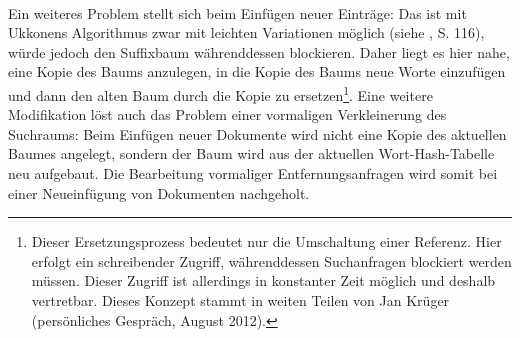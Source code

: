 \paragraph{} Ein weiteres Problem stellt sich beim Einfügen neuer Einträge: Das ist mit Ukkonens Algorithmus zwar mit leichten Variationen möglich (siehe \cite{gusfield}, S. 116), würde jedoch den Suffixbaum währenddessen blockieren. Daher liegt es hier nahe, eine Kopie des Baums anzulegen, in die Kopie des Baums neue Worte einzufügen und dann den alten Baum durch die Kopie zu ersetzen\footnote{Dieser Ersetzungsprozess bedeutet nur die Umschaltung einer Referenz. Hier erfolgt ein schreibender Zugriff, währenddessen Suchanfragen blockiert werden müssen. Dieser Zugriff ist allerdings in konstanter Zeit möglich und deshalb vertretbar. Dieses Konzept stammt in weiten Teilen von Jan Krüger (persönliches Gespräch, August 2012).}. Eine weitere Modifikation löst auch das Problem einer vormaligen Verkleinerung des Suchraums: Beim Einfügen neuer Dokumente wird nicht eine Kopie des aktuellen Baumes angelegt, sondern der Baum wird aus der aktuellen Wort-Hash-Tabelle neu aufgebaut. Die Bearbeitung vormaliger Entfernungsanfragen wird somit bei einer Neueinfügung von Dokumenten nachgeholt.